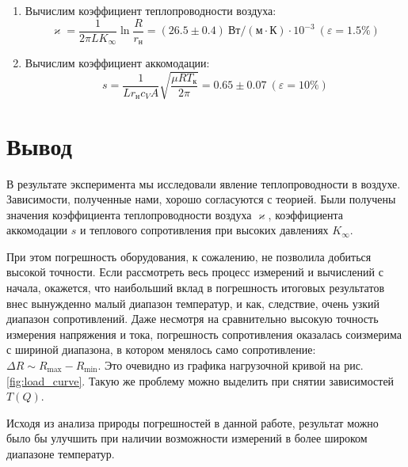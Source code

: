 \documentclass[12pt]{article}
\begin{document}
\begin{enumerate}
            \item Вычислим коэффициент теплопроводности воздуха:
            $$
            \varkappa = \frac{1}{2\pi LK_{\infty}}\ln{\frac{R}{r_{\text{н}}}} = (26.5\pm0.4)\ \text{Вт}/(\text{м}\cdot\text{К})\cdot10^{-3} \ (\varepsilon = 1.5\%)
            $$

            \item Вычислим коэффициент аккомодации:
            $$
            s = \frac{1}{Lr_{\text{н}}c_VA}\sqrt{\frac{\mu RT_{\text{к}}}{2\pi}} = 0.65\pm0.07\ (\varepsilon = 10\%)
            $$

        \end{enumerate}
    \section{Вывод}
    \par В результате эксперимента мы исследовали явление теплопроводности в воздухе. Зависимости, полученные нами,
    хорошо согласуются с теорией. Были получены значения коэффициента теплопроводности воздуха $\varkappa$,
    коэффициента аккомодации $s$ и теплового сопротивления при высоких давлениях $K_{\infty}$.
    \par При этом погрешность
    оборудования, к сожалению, не позволила добиться высокой точности. Если рассмотреть весь процесс измерений
    и вычислений с начала, окажется, что наибольший вклад в погрешность итоговых результатов внес вынужденно
    малый диапазон температур, и как, следствие, очень узкий диапазон сопротивлений. Даже несмотря на сравнительно
    высокую точность измерения напряжения и тока, погрешность сопротивления оказалась соизмерима с шириной
    диапазона, в котором менялось само сопротивление: $\Delta R \sim R_{\text{max}} - R_{\text{min}}$. Это очевидно
    из графика нагрузочной кривой на рис. \ref{fig:load_curve}. Такую же проблему можно выделить при снятии
    зависимостей $T(Q)$.
    \par Исходя из анализа природы погрешностей в данной работе, результат можно было бы улучшить при наличии
    возможности измерений в более широком диапазоне температур.
\end{document}
